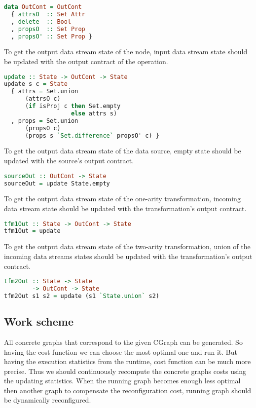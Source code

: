\begin{lstlisting}[language=Haskell]
data OutCont = OutCont
  { attrsO  :: Set Attr
  , delete  :: Bool
  , propsO  :: Set Prop
  , propsO' :: Set Prop }
\end{lstlisting}

To get the output data stream state of the node, input data stream state should be updated with the output contract of the operation.

\begin{lstlisting}[language=Haskell]
update :: State -> OutCont -> State
update s c = State
  { attrs = Set.union
      (attrsO c)
      (if isProj c then Set.empty
                   else attrs s)
  , props = Set.union
      (propsO c)
      (props s `Set.difference` propsO' c) }
\end{lstlisting}

To get the output data stream state of the data source, empty state should be updated with the source's output contract.

\begin{lstlisting}[language=Haskell]
sourceOut :: OutCont -> State
sourceOut = update State.empty
\end{lstlisting}

To get the output data stream state of the one-arity transformation, incoming data stream state should be updated with the transformation's output contract.

\begin{lstlisting}[language=Haskell]
tfm1Out :: State -> OutCont -> State
tfm1Out = update
\end{lstlisting}

To get the output data stream state of the two-arity transformation, union of the incoming data streams states should be updated with the transformation's output contract.

\begin{lstlisting}[language=Haskell]
tfm2Out :: State -> State
        -> OutCont -> State
tfm2Out s1 s2 = update (s1 `State.union` s2)
\end{lstlisting}

\subsection{Work scheme}

All concrete graphs that correspond to the given CGraph can be generated.
So having the cost function we can choose the most optimal one and run it.
But having the execution statistics from the runtime, cost function can be much more precise.
Thus we should continuously recompute the concrete graphs costs using the updating statistics.
When the running graph becomes enough less optimal then another graph to compensate the reconfiguration cost, running graph should be dynamically reconfigured.


